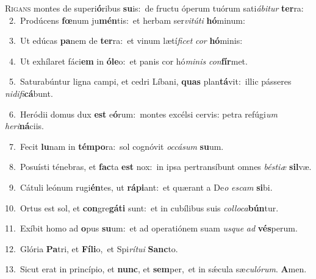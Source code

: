 \lettrine{\initial\textcolor{\initialcolor}{R}}{igans} montes de superi\-\textbf{ó}\-ribus \textbf{su}\-is:~\star de fructu óperum tuórum sati\-\textit{á}\-\textit{bi}\textit{tur} \textbf{ter}\-ra:\\
{\numbfont\textcolor{\numbcolor}{~2.}}~Prodúcens \textbf{fœ}\-num ju\-\textbf{mén}\-tis:~\star et herbam ser\-\textit{vi}\-\textit{tú}\textit{ti} \textbf{hó}\-minum:\par
{\numbfont\textcolor{\numbcolor}{~3.}}~Ut edúcas \textbf{pa}\-nem de \textbf{ter}\-ra:~\star et vinum lætí\-\textit{fi}\-\textit{cet} \textit{cor} \textbf{hó}\-minis:\par
{\numbfont\textcolor{\numbcolor}{~4.}}~Ut exhílaret fáci\textbf{em} in \textbf{ó}\-\textbf{le}o:~\star et panis cor hó\-\textit{mi}\-\textit{nis} \textit{con}\-\textbf{fír}met.\par
{\numbfont\textcolor{\numbcolor}{~5.}}~Saturabúntur ligna campi, et cedri Líbani, \textbf{quas} plan\-\textbf{tá}\-vit:~\star illic pásseres \textit{ni}\-\textit{di}\textit{fi}\textbf{cá}bunt.\par
{\numbfont\textcolor{\numbcolor}{~6.}}~Heródii domus dux \textbf{est} e\-\textbf{ó}\-rum:~\star montes excélsi cervis: petra refúgi\textit{um} \textit{he}\-\textit{ri}\textbf{ná}ciis.\par
{\numbfont\textcolor{\numbcolor}{~7.}}~Fecit \textbf{lu}\-nam in \textbf{tém}\-\textbf{po}ra:~\star sol cognóvit \textit{oc}\-\textit{cá}\textit{sum} \textbf{su}\-um.\par
{\numbfont\textcolor{\numbcolor}{~8.}}~Posuísti ténebras, et \textbf{fac}\-ta \textbf{est} nox:~\star in ipsa pertransíbunt omnes \textit{bés}\-\textit{ti}\textit{æ} \textbf{sil}\-væ.\par
{\numbfont\textcolor{\numbcolor}{~9.}}~Cátuli leónum rugi\-\textbf{én}\-tes, ut \textbf{rá}\-\textbf{pi}ant:~\star et quærant a De\textit{o} \textit{es}\-\textit{cam} \textbf{si}\-bi.\par
{\numbfont\textcolor{\numbcolor}{10.}}~Ortus est sol, et \textbf{con}\-gre\-\textbf{gá}\-\textbf{ti} sunt:~\star et in cubílibus suis \textit{col}\-\textit{lo}\textit{ca}\textbf{bún}tur.\par
{\numbfont\textcolor{\numbcolor}{11.}}~Exíbit homo ad \textbf{o}\-pus \textbf{su}\-um:~\star et ad operatiónem suam \textit{us}\-\textit{que} \textit{ad} \textbf{vés}\-perum.\par
{\numbfont\textcolor{\numbcolor}{12.}}~Glória \textbf{Pa}\-tri, et \textbf{Fí}\-\textbf{li}o,~\star et Spi\-\textit{rí}\-\textit{tu}\textit{i} \textbf{Sanc}\-to.\par
{\numbfont\textcolor{\numbcolor}{13.}}~Sicut erat in princípio, et \textbf{nunc}\-, et \textbf{sem}\-per,~\star et in sǽcula sæ\-\textit{cu}\-\textit{ló}\textit{rum}. \textbf{A}\-men.\par
